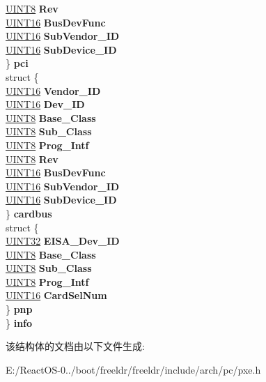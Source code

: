 \begin{DoxyCompactItemize}
\begin{tabbing}
\>\>\hyperlink{_processor_bind_8h_ab27e9918b538ce9d8ca692479b375b6a}{UINT8} {\bfseries Rev}\\
\>\>\hyperlink{_processor_bind_8h_a09f1a1fb2293e33483cc8d44aefb1eb1}{UINT16} {\bfseries BusDevFunc}\\
\>\>\hyperlink{_processor_bind_8h_a09f1a1fb2293e33483cc8d44aefb1eb1}{UINT16} {\bfseries SubVendor\_ID}\\
\>\>\hyperlink{_processor_bind_8h_a09f1a1fb2293e33483cc8d44aefb1eb1}{UINT16} {\bfseries SubDevice\_ID}\\
\>\} {\bfseries pci}\\
\>struct \{\\
\>\>\hyperlink{_processor_bind_8h_a09f1a1fb2293e33483cc8d44aefb1eb1}{UINT16} {\bfseries Vendor\_ID}\\
\>\>\hyperlink{_processor_bind_8h_a09f1a1fb2293e33483cc8d44aefb1eb1}{UINT16} {\bfseries Dev\_ID}\\
\>\>\hyperlink{_processor_bind_8h_ab27e9918b538ce9d8ca692479b375b6a}{UINT8} {\bfseries Base\_Class}\\
\>\>\hyperlink{_processor_bind_8h_ab27e9918b538ce9d8ca692479b375b6a}{UINT8} {\bfseries Sub\_Class}\\
\>\>\hyperlink{_processor_bind_8h_ab27e9918b538ce9d8ca692479b375b6a}{UINT8} {\bfseries Prog\_Intf}\\
\>\>\hyperlink{_processor_bind_8h_ab27e9918b538ce9d8ca692479b375b6a}{UINT8} {\bfseries Rev}\\
\>\>\hyperlink{_processor_bind_8h_a09f1a1fb2293e33483cc8d44aefb1eb1}{UINT16} {\bfseries BusDevFunc}\\
\>\>\hyperlink{_processor_bind_8h_a09f1a1fb2293e33483cc8d44aefb1eb1}{UINT16} {\bfseries SubVendor\_ID}\\
\>\>\hyperlink{_processor_bind_8h_a09f1a1fb2293e33483cc8d44aefb1eb1}{UINT16} {\bfseries SubDevice\_ID}\\
\>\} {\bfseries cardbus}\\
\>struct \{\\
\>\>\hyperlink{_processor_bind_8h_ae1e6edbbc26d6fbc71a90190d0266018}{UINT32} {\bfseries EISA\_Dev\_ID}\\
\>\>\hyperlink{_processor_bind_8h_ab27e9918b538ce9d8ca692479b375b6a}{UINT8} {\bfseries Base\_Class}\\
\>\>\hyperlink{_processor_bind_8h_ab27e9918b538ce9d8ca692479b375b6a}{UINT8} {\bfseries Sub\_Class}\\
\>\>\hyperlink{_processor_bind_8h_ab27e9918b538ce9d8ca692479b375b6a}{UINT8} {\bfseries Prog\_Intf}\\
\>\>\hyperlink{_processor_bind_8h_a09f1a1fb2293e33483cc8d44aefb1eb1}{UINT16} {\bfseries CardSelNum}\\
\>\} {\bfseries pnp}\\
\} {\bfseries info}\\

\end{tabbing}\end{DoxyCompactItemize}


该结构体的文档由以下文件生成\+:\begin{DoxyCompactItemize}
\item 
E\+:/\+React\+O\+S-\/0../boot/freeldr/freeldr/include/arch/pc/pxe.\+h\end{DoxyCompactItemize}
